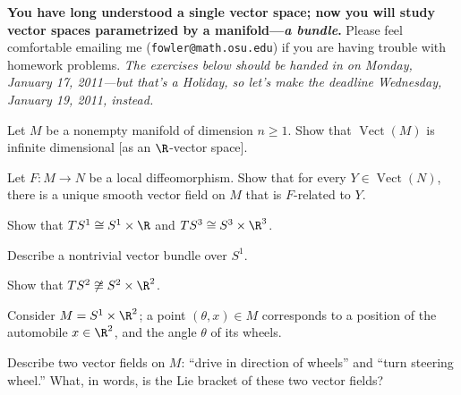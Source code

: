 \documentclass[12pt]{pset}
\author{Jim Fowler}
\date{Winter 2011}
\DeclareMathOperator{\Vect}{Vect}
\begin{document}
\maketitle

\noindent\textbf{You have long understood a single vector space; now
  you will study vector spaces parametrized by a manifold---\textit{a bundle}.}
Please feel comfortable emailing me (\texttt{fowler@math.osu.edu}) if
you are having trouble with homework problems.  \textit{The exercises
  below should be handed in on Monday, January 17, 2011---but that's a
  Holiday, so let's make the deadline Wednesday, January 19, 2011,
  instead.}

\begin{problem}[Lee 4--3]

Let $M$ be a nonempty manifold of dimension $n \geq 1$.  Show that
$\Vect(M)$ is infinite dimensional [as an $\R$-vector space].

\end{problem}

\begin{problem}[Lee 4--9]

Let $F : M \to N$ be a local diffeomorphism.  Show that for every $Y
\in \Vect(N)$, there is a unique smooth vector field on $M$ that is
$F$-related to $Y$.

\end{problem}

\begin{problem}
  Show that $TS^1 \cong S^1 \times \R$ and $TS^3 \cong S^3 \times
  \R^3$.
\end{problem}

\begin{problem}
Describe a nontrivial vector bundle over $S^1$.
\end{problem}

\begin{hardproblem}
Show that $TS^2 \not\cong S^2 \times \R^2$.
\end{hardproblem}

\begin{problem}

  Consider $M = S^1 \times \R^2$; a point $(\theta,x) \in M$
  corresponds to a position of the automobile $x \in \R^2$, and the
  angle $\theta$ of its wheels.

  Describe two vector fields on $M$: ``drive in direction of wheels''
  and ``turn steering wheel.''  What, in words, is the Lie bracket of
  these two vector fields?

\end{problem}
\end{document}
